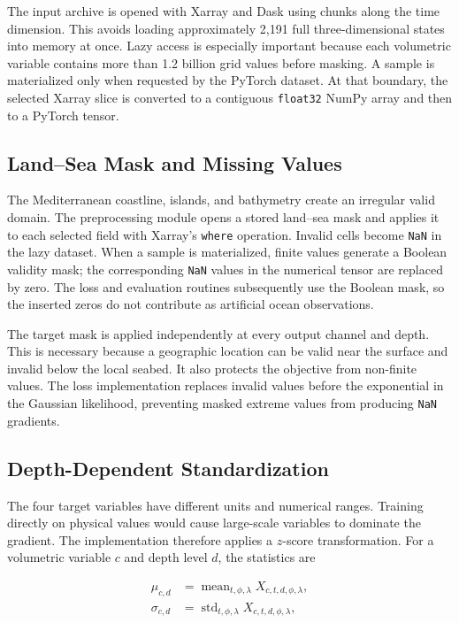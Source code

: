 The input archive is opened with Xarray and Dask using chunks along the time dimension. This avoids loading approximately 2,191 full three-dimensional states into memory at once. Lazy access is especially important because each volumetric variable contains more than 1.2 billion grid values before masking. A sample is materialized only when requested by the PyTorch dataset. At that boundary, the selected Xarray slice is converted to a contiguous \texttt{float32} NumPy array and then to a PyTorch tensor.

\subsection{Land--Sea Mask and Missing Values}

The Mediterranean coastline, islands, and bathymetry create an irregular valid domain. The preprocessing module opens a stored land--sea mask and applies it to each selected field with Xarray's \texttt{where} operation. Invalid cells become \texttt{NaN} in the lazy dataset. When a sample is materialized, finite values generate a Boolean validity mask; the corresponding \texttt{NaN} values in the numerical tensor are replaced by zero. The loss and evaluation routines subsequently use the Boolean mask, so the inserted zeros do not contribute as artificial ocean observations.

The target mask is applied independently at every output channel and depth. This is necessary because a geographic location can be valid near the surface and invalid below the local seabed. It also protects the objective from non-finite values. The loss implementation replaces invalid values before the exponential in the Gaussian likelihood, preventing masked extreme values from producing \texttt{NaN} gradients.

\subsection{Depth-Dependent Standardization}

The four target variables have different units and numerical ranges. Training directly on physical values would cause large-scale variables to dominate the gradient. The implementation therefore applies a $z$-score transformation. For a volumetric variable $c$ and depth level $d$, the statistics are

\begin{align}
\mu_{c,d} &= \operatorname{mean}_{t,\phi,\lambda} X_{c,t,d,\phi,\lambda},\\
\sigma_{c,d} &= \operatorname{std}_{t,\phi,\lambda} X_{c,t,d,\phi,\lambda},
\end{align}

